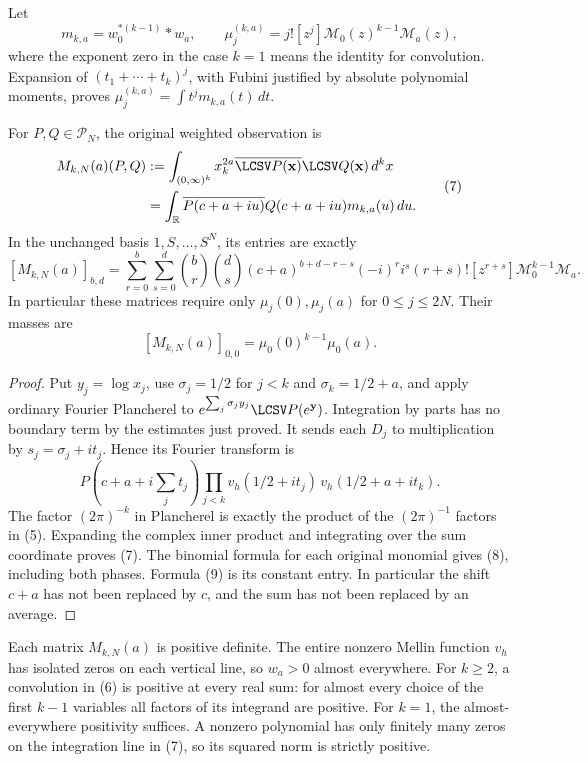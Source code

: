 \documentclass[10pt,a4paper,oneside]{report}
\begin{document}
Let
\[
 m_{k,a}=w_0^{*(k-1)}*w_a,\qquad
 \mu^{(k,a)}_j=j![z^j]\mathcal M_0(z)^{k-1}\mathcal M_a(z),
 \tag{6}
\]
where the exponent zero in the case \(k=1\) means the identity for
convolution. Expansion of \((t_1+\cdots+t_k)^j\), with Fubini
justified by absolute polynomial moments, proves
\(\mu^{(k,a)}_j=\int t^jm_{k,a}(t)\,dt\).

\begin{latecontroltheorem}
For \(P,Q\in\mathcal P_N\), the original weighted observation is
\[
 \begin{split}
 M_{k,N}(a)(P,Q)
 &:=\int_{(0,\infty)^k}x_k^{2a}
                 \overline{\LCSV P(\mathbf x)}\LCSV Q(\mathbf x)\,d^kx\\
 &=\int_{\mathbb R}\overline{P(c+a+iu)}Q(c+a+iu)
                 m_{k,a}(u)\,du.
 \end{split}
 \tag{7}
\]
In the unchanged basis \(1,S,\ldots,S^N\), its entries are exactly
\[
 [M_{k,N}(a)]_{b,d}
 =\sum_{r=0}^b\sum_{s=0}^d
 \binom br\binom ds(c+a)^{b+d-r-s}(-i)^ri^s
 (r+s)![z^{r+s}]\mathcal M_0^{k-1}\mathcal M_a.
 \tag{8}
\]
In particular these matrices require only \(\mu_j(0),\mu_j(a)\)
for \(0\le j\le2N\). Their masses are
\[
 [M_{k,N}(a)]_{0,0}=\mu_0(0)^{k-1}\mu_0(a).
 \tag{9}
\]
\end{latecontroltheorem}
\begin{proof}
Put \(y_j=\log x_j\), use \(\sigma_j=1/2\) for \(j<k\) and
\(\sigma_k=1/2+a\), and apply ordinary Fourier Plancherel to
\(e^{\sum_j\sigma_jy_j}\LCSV P(e^{\mathbf y})\). Integration by
parts has no boundary term by the estimates just proved. It sends each
\(D_j\) to multiplication by \(s_j=\sigma_j+it_j\). Hence its
Fourier transform is
\[
 P(c+a+i\textstyle\sum_jt_j)
 \prod_{j<k}v_h(1/2+it_j)\,v_h(1/2+a+it_k).
\]
The factor \((2\pi)^{-k}\) in Plancherel is exactly the product of
the \((2\pi)^{-1}\) factors in (5). Expanding the complex inner
product and integrating over the sum coordinate proves (7). The
binomial formula for each original monomial gives (8), including both
phases. Formula (9) is its constant entry. In particular the shift
\(c+a\) has not been replaced by \(c\), and the sum has not been
replaced by an average.
\end{proof}

Each matrix \(M_{k,N}(a)\) is positive definite. The entire nonzero
Mellin function \(v_h\) has isolated zeros on each vertical line, so
\(w_a>0\) almost everywhere. For \(k\ge2\), a convolution in (6)
is positive at every real sum: for almost every choice of the first
\(k-1\) variables all factors of its integrand are positive. For
\(k=1\), the almost-everywhere positivity suffices. A nonzero
polynomial has only finitely many zeros on the integration line in
(7), so its squared norm is strictly positive.
\end{document}
